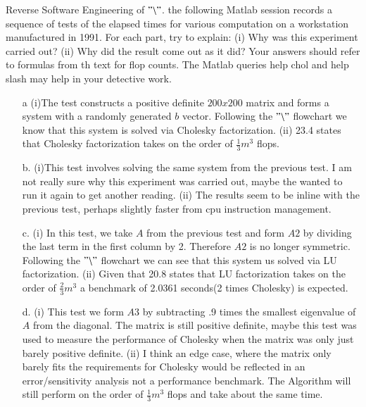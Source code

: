 \documentclass[12pt]{article}
\makeatletter
\theoremstyle{homework}
\newenvironment{exercise}[1]
{\def\@currentlabel{#1}\exercisecore}
{\endexercisecore}
\makeatother
\begin{document}
\begin{exercise}{23.3} Reverse Software Engineering of $"\backslash"$. the following Matlab session records a sequence of tests of the elapsed times for various computation 
  on a workstation manufactured in 1991. For each part, try to explain: (i) Why was this experiment carried out? (ii) Why did the result come out as it did? Your answers should 
  refer to formulas from th text for flop counts. The Matlab queries help chol and help slash may help in your detective work. \\
  \begin{enumerate}
    \item[a] (i)The test constructs a positive definite $200x200$ matrix and forms a system with a randomly generated $b$ vector. 
    Following the $"\backslash"$ flowchart we know that this system is solved via Cholesky factorization. (ii) 23.4 states that Cholesky factorization 
    takes on the order of $\frac{1}{3}m^3$ flops.\\
    \vspace{.15in}

    \item[b.] (i)This test involves solving the same system from the previous test. I am not really sure why this experiment was carried out, maybe 
    the wanted to run it again to get another reading. (ii) The results seem to be inline with the previous test, perhaps slightly faster from cpu instruction management.  
    \vspace{.15in}

    \item[c.] (i) In this test, we take $A$ from the previous test and form $A2$ by dividing the last term in the first column by 2. Therefore $A2$ is no longer symmetric. Following the 
    $"\backslash"$ flowchart we can see that this system us solved via LU factorization. (ii) Given that 20.8 states that LU factorization takes on the order of $\frac{2}{3}m^3$ a benchmark of 2.0361 seconds(2 times Cholesky)
    is expected. 
    \vspace{.15in}

    \item[d.] (i) This test we form $A3$ by subtracting .9 times the smallest eigenvalue of $A$ from the diagonal. The matrix is still positive definite, maybe this test 
    was used to measure the performance of Cholesky when the matrix was only just barely positive definite. (ii) I think an edge case, where the matrix only barely fits the requirements for Cholesky would be reflected in an error/sensitivity analysis
    not a performance benchmark. The Algorithm will still perform on the order of $\frac{1}{3}m^3$ flops and take about the same time. 
    \vspace{.15in}



\end{enumerate}
\end{exercise}
\end{document}

